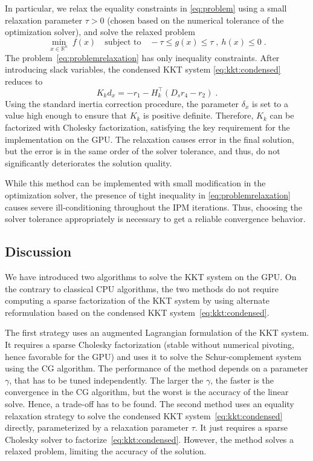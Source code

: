 In particular, we relax the equality constraints in \eqref{eq:problem} using a small relaxation parameter $\tau > 0$ (chosen based on the numerical tolerance of the optimization solver), and solve the relaxed problem
\begin{equation}
  \label{eq:problemrelaxation}
    \min_{x \in \mathbb{R}^n} \;  f(x)
\quad \text{subject to}\quad
     - \tau \leq g(x) \leq \tau \;,~  h(x) \leq 0  \; .
\end{equation}
The problem~\eqref{eq:problemrelaxation} has only inequality constraints. After introducing slack variables, the condensed KKT system
\eqref{eq:kkt:condensed} reduces to
\begin{equation}
  \label{eq:liftedkkt}
    K_k d_x = - r_1 - H_k^\top(D_s r_4 - r_2) \; .
\end{equation}
Using the standard inertia correction procedure, the parameter $\delta_x$ is set to a value high enough to ensure that  $K_k$ is positive definite. Therefore, $K_k$ can be factorized with Cholesky factorization, satisfying the key requirement for the implementation on the GPU. The relaxation causes error in the final solution, but the error is in the same order of the solver tolerance, and thus, do not significantly deteriorates the solution quality.

While this method can be implemented with small modification in the optimization solver, the presence of tight inequality in \eqref{eq:problemrelaxation} causes severe ill-conditioning throughout the IPM iterations. Thus,
choosing the solver tolerance appropriately is necessary to get a reliable convergence behavior.


\subsection{Discussion}
We have introduced two algorithms to solve
the KKT system on the GPU. On the contrary to classical CPU algorithms,
the two methods do not require computing a sparse \lblt factorization of the KKT
system by using alternate reformulation based on the condensed KKT
system~\eqref{eq:kkt:condensed}.

The first strategy uses an augmented Lagrangian formulation
of the KKT system. It requires a sparse Cholesky factorization (stable without numerical
pivoting, hence favorable for the GPU) and uses it to solve the Schur-complement system
using the CG algorithm. The performance of the method depends on a parameter $\gamma$, that
has to be tuned independently. The larger the $\gamma$, the faster is the convergence
in the CG algorithm, but the worst is the accuracy of the linear solve. Hence, a trade-off
has to be found. The second method uses an equality relaxation strategy to
solve the condensed KKT system~\eqref{eq:kkt:condensed} directly, parameterized
by a relaxation parameter $\tau$. It just requires
a sparse Cholesky solver to factorize~\eqref{eq:kkt:condensed}. However, the method
solves a relaxed problem, limiting the accuracy
of the solution.


